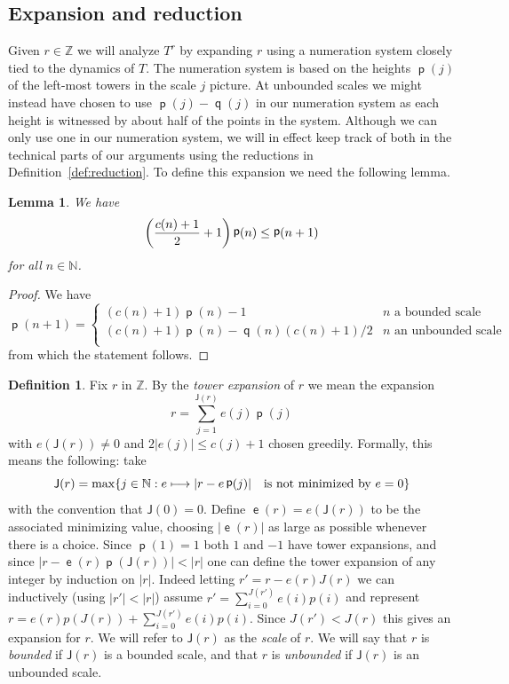 \documentclass[10pt]{amsart}
\newtheorem{lemm}[theo]{Lemma}\newtheorem{prop}[theo]{Proposition}\newtheorem{coro}[theo]{Corollary}\newtheorem{conj}[theo]{Conjecture}
\theoremstyle{definition}\newtheorem{defi}[theo]{Definition}\newtheorem{rema}[theo]{Remark}\newtheorem{exam}[theo]{Example}\newtheorem{exem}[theo]{Example}\newtheorem{nota}[theo]{Notation}
\DeclareMathOperator{\lst}{\mathsf{e}}
\DeclareMathOperator{\p}{\mathsf{p}}
\DeclareMathOperator{\q}{\mathsf{q}}
\newcommand{\N}{\mathbb{N}}
\newcommand{\Z}{\mathbb{Z}}
\newcommand{\scl}{\mathsf{J}}
\let\originalleft\left
\let\originalright\right
\renewcommand{\left}{\mathopen{}\mathclose\bgroup\originalleft}
\renewcommand{\right}{\aftergroup\egroup\originalright}
\let\oldmapsto\mapsto
\renewcommand*{\mapsto}{\mathchoice{\longmapsto}{\oldmapsto}{\oldmapsto}{\oldmapsto}}
\begin{document}
\subsection{Expansion and reduction}\label{subsec:expansion_reduction}
Given $r \in \Z$ we will analyze $T^r$ by expanding $r$ using a numeration system closely tied to the dynamics of $T$. The numeration system is based on the heights $\p(j)$ of the left-most towers in the scale $j$ picture. At unbounded scales we might instead have chosen to use $\p(j) - \q(j)$ in our numeration system as each height is witnessed by about half of the points in the system. Although we can only use one in our numeration system, we will in effect keep track of both in the technical parts of our arguments using the reductions in Definition~\ref{def:reduction}. To define this expansion we need the following lemma.

\begin{lemm}\label{lem:expansion_defined}
We have
\[
\left(\frac{c(n) + 1}{2} + 1 \right) \p(n) \le \p(n+1)
\]
for all $n \in \N$.
\end{lemm}
\begin{proof}
We have
\[
\p(n+1) =
\begin{cases}
(c(n) + 1) \p(n) - 1 & n \text{ a bounded scale} \\
(c(n) + 1) \p(n) - \q(n) (c(n)+1)/2 & n \text{ an unbounded scale} \\
\end{cases}
\]
from which the statement follows.
\end{proof}
\begin{defi}
Fix $r$ in $\Z$. By the
\emph{tower expansion} of $r$ we mean the expansion
\begin{equation}\label{eqn:rigidity_expan}
r = \sum_{j=1}^{\scl(r)} e(j) \p(j)
\end{equation}
with $e(\scl(r)) \ne 0$ and $2|e(j)| \le c(j)+1$ chosen greedily. Formally, this means the following: take
\[
\scl(r) =
\max
\left\{ j \in \N : e \mapsto |r - e \p(j)|\quad
\text{is not minimized by } e = 0
\right\}
\]
with the convention that $\scl(0) = 0$. Define $\lst(r) = e(\scl(r))$ to be the associated minimizing value, choosing $|\!\lst(r)|$ as large as possible whenever there is a choice. Since $\p(1) = 1$ both $1$ and $-1$ have tower expansions, and since $|r - \lst(r) \p(\scl(r))| < |r|$ one can define the tower expansion of any integer by induction on $|r|$. Indeed letting $r'=r-e(r)J(r)$ we can inductively (using $|r'|<|r|$) assume $r'=\sum_{i=0}^{J(r')}e(i)p(i)$ and represent $r=e(r)p(J(r))+\sum_{i=0}^{J(r')}e(i)p(i)$. Since $J(r')<J(r)$ this gives an expansion for $r$. We will refer to $\scl(r)$ as the
\emph{scale} of $r$. We will say that $r$ is
\emph{bounded} if $\scl(r)$ is a bounded scale, and that $r$ is
\emph{unbounded} if $\scl(r)$ is an unbounded scale.
\end{defi}
\end{document}
